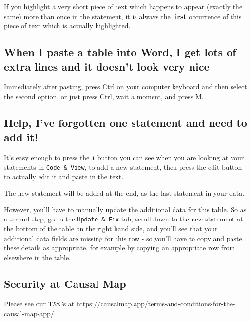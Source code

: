 \documentclass[
]{book}
\begin{document}
If you highlight a very short piece of text which happens to appear (exactly the same) more than once in the statement, it is always the \textbf{first} occurrence of this piece of text which is actually highlighted.

\hypertarget{when-i-paste-a-table-into-word-i-get-lots-of-extra-lines-and-it-doesnt-look-very-nice}{%
\subsection{When I paste a table into Word, I get lots of extra lines and it doesn't look very nice}\label{when-i-paste-a-table-into-word-i-get-lots-of-extra-lines-and-it-doesnt-look-very-nice}}

Immediately after pasting, press Ctrl on your computer keyboard and then select the second option, or just press Ctrl, wait a moment, and press M.

\hypertarget{help-ive-forgotten-one-statement-and-need-to-add-it}{%
\subsection{Help, I've forgotten one statement and need to add it!}\label{help-ive-forgotten-one-statement-and-need-to-add-it}}

It's easy enough to press the \texttt{+} button you can see when you are looking at your statements in \texttt{Code\ \&\ View}, to add a new statement, then press the edit button to actually edit it and paste in the text.

The new statement will be added at the end, as the last statement in your data.

However, you'll have to manually update the additional data for this table. So as a second step, go to the \texttt{Update\ \&\ Fix} tab, scroll down to the new statement at the bottom of the table on the right hand side, and you'll see that your additional data fields are missing for this row - so you'll have to copy and paste these details as appropriate, for example by copying an appropriate row from elsewhere in the table.

\hypertarget{security-at-causal-map}{%
\subsection{Security at Causal Map}\label{security-at-causal-map}}

Please see our T\&Cs at \url{https://causalmap.app/terms-and-conditions-for-the-causal-map-app/}
\end{document}
